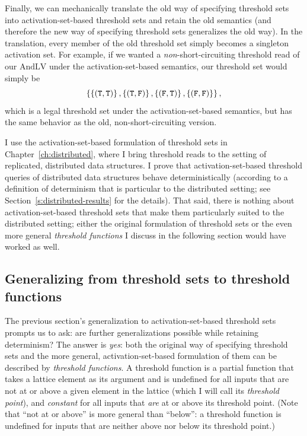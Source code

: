Finally, we can mechanically translate the old way of specifying
threshold sets into activation-set-based threshold sets and retain the
old semantics (and therefore the new way of specifying threshold sets
generalizes the old way).  In the translation, every member of the old
threshold set simply becomes a singleton activation set.  For example,
if we wanted a \emph{non}-short-circuiting threshold read of our
$\mathrm{AndLV}$ under the activation-set-based semantics, our
threshold set would simply be
\[
\left\{
  \left\{ (\texttt{T},\texttt{T}) \right\},
  \left\{ (\texttt{T},\texttt{F}) \right\},
  \left\{ (\texttt{F},\texttt{T}) \right\},
  \left\{ (\texttt{F},\texttt{F}) \right\}
\right\},
\]
which is a legal threshold set under the activation-set-based
semantics, but has the same behavior as the old, non-short-circuiting
version.

I use the activation-set-based formulation of threshold sets in
Chapter~\ref{ch:distributed}, where I bring threshold reads to the
setting of replicated, distributed data structures.  I prove that
activation-set-based threshold queries of distributed data structures
behave deterministically (according to a definition of determinism
that is particular to the distributed setting; see
Section~\ref{s:distributed-results} for the details).  That said,
there is nothing about activation-set-based threshold sets that make
them particularly suited to the distributed setting; either the
original formulation of threshold sets or the even more general
\emph{threshold functions} I discuss in the following section would
have worked as well.

\subsection{Generalizing from threshold sets to threshold functions}\label{subsection:lvars-generalizing-from-threshold-sets-to-threshold-functions}

The previous section's generalization to activation-set-based
threshold sets prompts us to ask: are further generalizations possible
while retaining determinism?  The answer is \emph{yes}: both the
original way of specifying threshold sets and the more general,
activation-set-based formulation of them can be described by
\emph{threshold functions}.  A threshold function is a partial
function that takes a lattice element as its argument and is undefined
for all inputs that are not at or above a given element in the lattice
(which I will call its \emph{threshold point}), and \emph{constant}
for all inputs that \emph{are} at or above its threshold point.  (Note
that ``not at or above'' is more general than ``below'': a threshold
function is undefined for inputs that are neither above nor below its
threshold point.)

